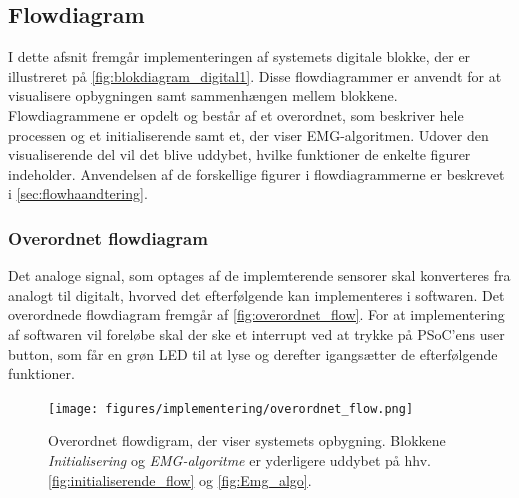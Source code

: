 \subsection{Flowdiagram}
I dette afsnit fremgår implementeringen af systemets digitale blokke, der er illustreret på \autoref{fig:blokdiagram_digital1}. Disse flowdiagrammer er anvendt for at visualisere opbygningen samt sammenhængen mellem blokkene. Flowdiagrammene er opdelt og består af et overordnet, som beskriver hele processen og et initialiserende samt et, der viser EMG-algoritmen. Udover den visualiserende del vil det blive uddybet, hvilke funktioner de enkelte figurer indeholder. Anvendelsen af de forskellige figurer i flowdiagrammerne er beskrevet i \autoref{sec:flowhaandtering}.

\subsubsection{Overordnet flowdiagram}
Det analoge signal, som optages af de implemterende sensorer skal konverteres fra analogt til digitalt, hvorved det efterfølgende kan implementeres i softwaren. Det overordnede flowdiagram fremgår af \autoref{fig:overordnet_flow}. For at implementering af softwaren vil foreløbe skal der ske et interrupt ved at trykke på PSoC'ens user button, som får en grøn LED til at lyse og derefter igangsætter de efterfølgende funktioner. 
\begin{figure}[H]
\centering
\texttt{[image: figures/implementering/overordnet\_flow.png]}
\caption{Overordnet flowdigram, der viser systemets opbygning. Blokkene \emph{Initialisering} og \emph{EMG-algoritme} er yderligere uddybet på hhv. \autoref{fig:initialiserende_flow} og \autoref{fig:Emg_algo}. }
\label{fig:overordnet_flow}
\end{figure}

